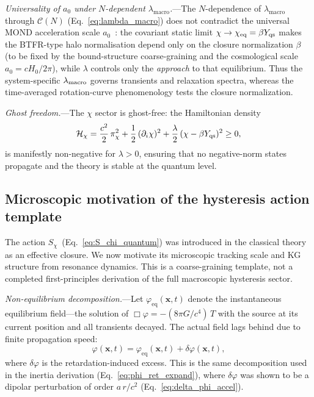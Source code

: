 \documentclass[aps,prd,onecolumn,superscriptaddress,nofootinbib,showpacs,12pt,notitlepage]{revtex4-2}
\begin{document}
\textit{Universality of $a_0$ under $N$-dependent
$\lambda_{\mathrm{macro}}$.}---The $N$-dependence of
$\lambda_{\mathrm{macro}}$ through $\mathcal{C}(N)$
(Eq.~\ref{eq:lambda_macro}) does not contradict the
universal MOND acceleration scale
$a_0$~\cite{Lotishvili2026}: the covariant static
limit $\chi \to \chi_{\rm eq} = \beta Y_{\rm qs}$ makes the
BTFR-type halo normalisation depend only on the
closure normalization $\beta$ (to be fixed by the
bound-structure coarse-graining and the cosmological scale
$a_0 = cH_0/2\pi$), while
$\lambda$ controls only the \emph{approach} to that
equilibrium.  Thus the system-specific $\lambda_{\rm
macro}$ governs transients and relaxation spectra,
whereas the time-averaged rotation-curve phenomenology tests the
closure normalization.

\textit{Ghost freedom.}---The $\chi$ sector is ghost-free:
the Hamiltonian density
\begin{equation}\label{eq:H_chi_q}
  \mathcal{H}_\chi
  = \frac{c^2}{2}\,\pi_\chi^2
  + \frac{1}{2}\,(\partial_i\chi)^2
  + \frac{\lambda}{2}\,(\chi - \beta Y_{\rm qs})^2
  \geq 0,
\end{equation}
is manifestly non-negative for $\lambda > 0$, ensuring
that no negative-norm states propagate and the theory
is stable at the quantum level.

\subsection{Microscopic motivation of the hysteresis action template}
\label{sec:chi_derivation}

The action $S_\chi$~(Eq.~\ref{eq:S_chi_quantum}) was
introduced in the classical theory~\cite{Lotishvili2026}
as an effective closure.  We now motivate its microscopic
tracking scale and KG structure from resonance dynamics.  This is a
coarse-graining template, not a completed first-principles derivation
of the full macroscopic hysteresis sector.

\textit{Non-equilibrium decomposition.}---Let
$\varphi_{\mathrm{eq}}(\mathbf{x},t)$ denote the
instantaneous equilibrium field---the solution of
$\Box\varphi = -(8\pi G/c^4)\,T$ with the source at its
current position and all transients decayed.  The actual
field lags behind due to finite propagation speed:
\begin{equation}\label{eq:phi_noneq}
  \varphi(\mathbf{x},t)
  = \varphi_{\mathrm{eq}}(\mathbf{x},t)
  + \delta\varphi(\mathbf{x},t),
\end{equation}
where $\delta\varphi$ is the retardation-induced excess.
This is the same decomposition used in the inertia
derivation (Eq.~\ref{eq:phi_ret_expand}), where
$\delta\varphi$ was shown to be a dipolar perturbation of
order $a\,r/c^2$ (Eq.~\ref{eq:delta_phi_accel}).
\end{document}
